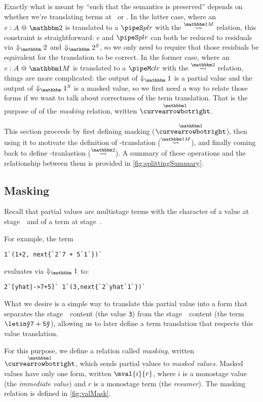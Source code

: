 \begin{abstrsyn}
Exactly what is meant by ``such that the semantics is preserved'' depends on whether we're translating
terms at \bbonem\ or \bbtwo.  
In the latter case, where an $\coltwo e A$ is translated to a $\pipeS p l r$ with the $\splitonesym$ relation,
this constraint is straightforward: $e$ and $\pipeS p l r$ can both be reduced to residuals
via $\redtwosym$ and $\sepredtwosym$, so we only need to require that those
residuals be equivalent for the translation to be correct.
In the former case, where an $\colone e A$ is translated to a $\pipeM c l r$ with the $\splittwosym$ relation, 
things are more complicated: 
the output of $\redonesym$ is a partial value and the output of $\sepredonesym$ is a masked value,
so we first need a way to relate those forms if we want to talk about correctness of the term translation.
That is the purpose of of the {\em masking} relation, written $\vsplito$.

This section proceeds by first defining masking ($\vsplito$), 
then using it to motivate the definition of \bbonem-translation ($\splitonesym$),
and finally coming back to define \bbtwo-tranlastion ($\splittwosym$).
A summary of these operations and the relationship between them is provided in \ref{fig:splittingSummary}.

\subsection{Masking}

Recall that partial values are multistage terms with the character of a value at stage~\bbone\ and of a term at stage~\bbtwo.

For example, the term
\begin{lstlisting}
1`(1+2, next{`2`7 + 5`1`})`
\end{lstlisting}
evaluates via $\redonesym$ to:
\begin{lstlisting}
2`[yhat|->7+5]` 1`(3,next{`2`yhat`1`})`
\end{lstlisting}

What we desire is a simple way to translate this partial value into a form that separates the stage~\bbone\ content (the value \texttt{3}) 
from the stage~\bbtwo\ content (the term $\letin \yhat {\mathtt{7+5}} \yhat$),
allowing us to later define a term translation that respects this value translation.

For this purpose, we define a relation called {\em masking}, written $\vsplito$, 
which sends partial values to {\em masked values}.
Masked values have only one form, written $\mval {i} {r}$, 
where $i$ is a monostage value (the {\em immediate value}) and $r$ is a monostage term (the {\em resumer}).
The masking relation is defined in \ref{fig:valMask}.


\end{abstrsyn}
